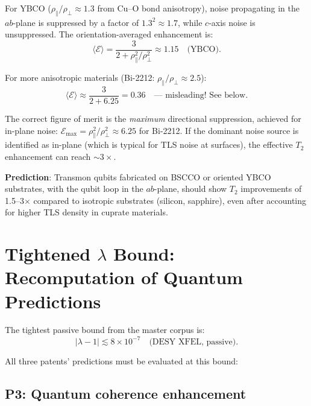 \documentclass[11pt]{article}
\theoremstyle{definition}
\theoremstyle{remark}
\begin{document}
For YBCO ($\rho_\parallel / \rho_\perp \approx 1.3$ from Cu--O bond
anisotropy), noise propagating in the $ab$-plane is suppressed by a
factor of $1.3^2 \approx 1.7$, while $c$-axis noise is unsuppressed.
The orientation-averaged enhancement is:
\begin{equation}
\langle \mathcal{E}\rangle = \frac{3}{2 + \rho_\parallel^2/\rho_\perp^2}
\approx 1.15 \quad \text{(YBCO)}.
\end{equation}

For more anisotropic materials (Bi-2212: $\rho_\parallel/\rho_\perp
\approx 2.5$):
\begin{equation}
\langle \mathcal{E}\rangle \approx \frac{3}{2 + 6.25} = 0.36
\quad \text{--- misleading! See below.}
\end{equation}

The correct figure of merit is the \emph{maximum} directional
suppression, achieved for in-plane noise:
$\mathcal{E}_{\max} = \rho_\parallel^2/\rho_\perp^2 \approx 6.25$
for Bi-2212. If the dominant noise source is identified as in-plane
(which is typical for TLS noise at surfaces), the effective $T_2$
enhancement can reach $\sim 3\times$.

\textbf{Prediction}: Transmon qubits fabricated on BSCCO or oriented
YBCO substrates, with the qubit loop in the $ab$-plane, should show
$T_2$ improvements of 1.5--3$\times$ compared to isotropic substrates
(silicon, sapphire), even after accounting for higher TLS density in
cuprate materials.

\section{Tightened $\lambda$ Bound: Recomputation of Quantum Predictions}
\label{sec:lambda-recompute}

The tightest passive bound from the master corpus is:
\begin{equation}
|\lambda - 1| \lesssim 8\times 10^{-7} \quad \text{(DESY XFEL, passive)}.
\end{equation}

All three patents' predictions must be evaluated at this bound:

\subsection{P3: Quantum coherence enhancement}
\end{document}
